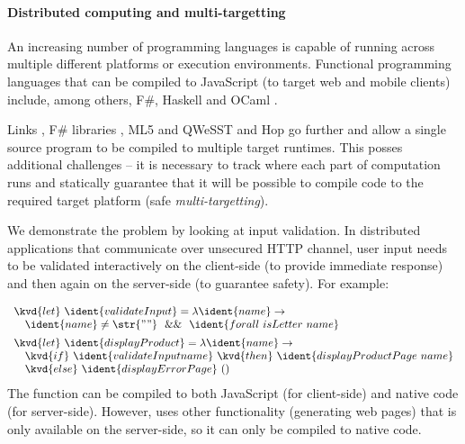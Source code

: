 
\paragraph{Distributed computing and multi-targetting}

An increasing number of programming languages is capable of running across multiple different 
platforms or execution environments. Functional programming languages that can be compiled to
JavaScript (to target web and mobile clients) include, among others, F\#, Haskell and OCaml \cite{app-ocaml-js}.

Links \cite{app-distributed-links}, F\# libraries \cite{app-fsharp-webapps,app-fsharp-webtools},
ML5 and QWeSST \cite{app-distributed-ml5, app-distributed-qwesst} and Hop \cite{app-hop-lang} go 
further and allow a single source program to be compiled to multiple target runtimes. This posses 
additional challenges -- it is necessary to track where each part of computation runs and statically 
guarantee that it will be possible to compile code to the required target platform 
(safe \emph{multi-targetting}).

We demonstrate the problem by looking at input validation. In distributed applications 
that communicate over unsecured HTTP channel, user input needs to be validated interactively
on the client-side (to provide immediate response) and then again on the server-side (to 
guarantee safety). For example:

\begin{equation*}
\begin{array}{l}
\kvd{let}~\ident{validateInput} = \lambda \ident{name} \rightarrow\\
\quad\ident{name} \neq \str{""} ~~\&\&~~ \ident{forall~isLetter~name}
\\[0.5em]
\kvd{let}~\ident{displayProduct} = \lambda \ident{name} \rightarrow\\
\quad\kvd{if}~\ident{validateInput name}~\kvd{then}~\ident{displayProductPage~name}\\
\quad\kvd{else}~\ident{displayErrorPage}~() 
\end{array}
\end{equation*}
%
The function  can be compiled to both JavaScript (for client-side) and
native code (for server-side). However,  uses other functionality
(generating web pages) that is only available on the server-side, so it can only be compiled to
native code.

